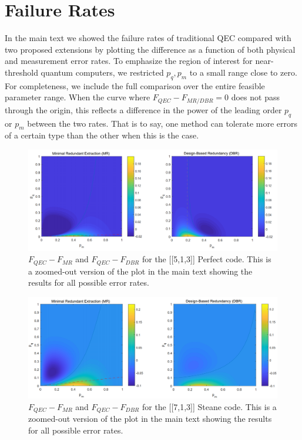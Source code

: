 \documentclass[superscriptaddress, notitlepage]{revtex4-1}
\begin{document}
\section{Failure Rates}

In the main text we showed the failure rates of traditional QEC compared with two proposed extensions by plotting the difference as a function of both physical and measurement error rates. To emphasize the region of interest for near-threshold quantum computers, we restricted $p_q, p_m$ to a small range close to zero. For completeness, we include the full comparison over the entire feasible parameter range. When the curve where $F_{QEC} - F_{MR/DBR} = 0$ does not pass through the origin, this reflects a difference in the power of the leading order $p_q$ or $p_m$ between the two rates. That is to say, one method can tolerate more errors of a certain type than the other when this is the case.

\begin{figure}
	\centering
	\includegraphics[width=\linewidth]{5_qubit_crop.PNG}
	\caption{$F_{QEC} - F_{MR}$ and $F_{QEC} - F_{DBR}$ for the [[5,1,3]] Perfect code. This is a zoomed-out version of the plot in the main text showing the results for all possible error rates.}
	\label{fig:5qubitperfectcodefullrange}
\end{figure}

\begin{figure}
	\centering
	\includegraphics[width=\linewidth]{steane_crop.PNG}
	\caption{$F_{QEC} - F_{MR}$ and $F_{QEC} - F_{DBR}$ for the [[7,1,3]] Steane code. This is a zoomed-out version of the plot in the main text showing the results for all possible error rates.}
	\label{fig:steanecodefullrange}
\end{figure}
\end{document}

